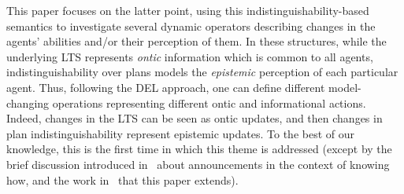 %
%
%

\smallskip

This paper focuses on the latter point, using this in\-dis\-tin\-guisha\-bil\-i\-ty-based semantics to investigate several dynamic operators describing changes in the agents' abilities and/or their perception of them. In these structures, while the underlying LTS represents \emph{ontic} information which is common to all agents, indistinguishability over plans models the \emph{epistemic} perception of each particular agent. Thus, following the DEL approach, one can define different model-changing operations representing different ontic and informational actions. Indeed, changes in the LTS can be seen as ontic updates, and then changes in plan indistinguishability represent epistemic updates. To the best of our knowledge, this is the first time in which this theme is addressed (except by the brief discussion introduced in~\cite{Wang2016} about announcements in the context of knowing how, and the work in~\cite{AFSV22} that this paper extends). 

